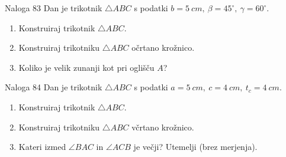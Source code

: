         \begin{frame}
            \begin{exampleblock}{Naloga 83}
                Dan je trikotnik $\triangle ABC$ s podatki $b=5~cm,\ \beta=45^\circ,\ \gamma=60^\circ$.
                \begin{enumerate}
                    \item Konstruiraj trikotnik $\triangle ABC$.
                    \item Konstruiraj trikotniku $\triangle ABC$ očrtano krožnico.
                    \item Koliko je velik zunanji kot pri oglišču $A$?
                \end{enumerate}
            \end{exampleblock}

            \pause
            \begin{exampleblock}{Naloga 84}
                Dan je trikotnik $\triangle ABC$ s podatki $a=5~cm,\ c=4~cm,\ t_c=4~cm$.
                \begin{enumerate}
                    \item Konstruiraj trikotnik $\triangle ABC$.
                    \item Konstruiraj trikotniku $\triangle ABC$ včrtano krožnico.
                    \item Kateri izmed $\angle BAC$ in $\angle ACB$ je večji? Utemelji (brez merjenja).
                \end{enumerate}
            \end{exampleblock}
        \end{frame}



